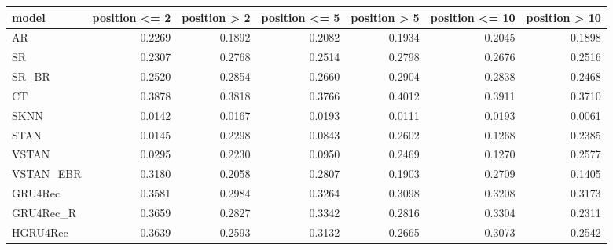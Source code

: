 \begin{tabular}{lrrrrrr}
\toprule
     model &  position <= 2 &  position > 2 &  position <= 5 &  position > 5 &  position <= 10 &  position > 10 \\
\midrule
        AR &         0.2269 &        0.1892 &         0.2082 &        0.1934 &          0.2045 &         0.1898 \\
        SR &         0.2307 &        0.2768 &         0.2514 &        0.2798 &          0.2676 &         0.2516 \\
     SR\_BR &         0.2520 &        0.2854 &         0.2660 &        0.2904 &          0.2838 &         0.2468 \\
        CT &         0.3878 &        0.3818 &         0.3766 &        0.4012 &          0.3911 &         0.3710 \\
      SKNN &         0.0142 &        0.0167 &         0.0193 &        0.0111 &          0.0193 &         0.0061 \\
      STAN &         0.0145 &        0.2298 &         0.0843 &        0.2602 &          0.1268 &         0.2385 \\
     VSTAN &         0.0295 &        0.2230 &         0.0950 &        0.2469 &          0.1270 &         0.2577 \\
 VSTAN\_EBR &         0.3180 &        0.2058 &         0.2807 &        0.1903 &          0.2709 &         0.1405 \\
   GRU4Rec &         0.3581 &        0.2984 &         0.3264 &        0.3098 &          0.3208 &         0.3173 \\
 GRU4Rec\_R &         0.3659 &        0.2827 &         0.3342 &        0.2816 &          0.3304 &         0.2311 \\
  HGRU4Rec &         0.3639 &        0.2593 &         0.3132 &        0.2665 &          0.3073 &         0.2542 \\
\bottomrule
\end{tabular}

